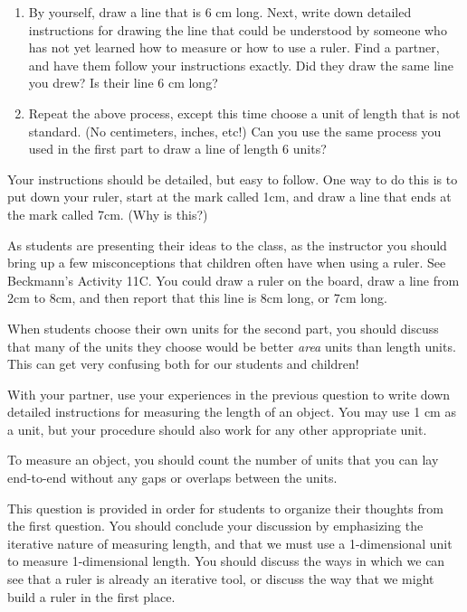 \documentclass[handout]{ximera}
\begin{document}
\begin{problem}
\hfill
\begin{enumerate}
\item By yourself, draw a line that is 6 cm long.  Next, write down detailed instructions for drawing the line that could be understood by someone who has not yet learned how to measure or how to use a ruler.  Find a partner, and have them follow your instructions exactly.  Did they draw the same line you drew?  Is their line 6 cm long?  
\item Repeat the above process, except this time choose a unit of length that is not standard.  (No centimeters, inches, etc!)  Can you use the same process you used in the first part to draw a line of length 6 units?
\end{enumerate}


\begin{solution}
Your instructions should be detailed, but easy to follow.  One way to do this is to put down your ruler, start at the mark called 1cm, and draw a line that ends at the mark called 7cm.  (Why is this?)
\end{solution}

\begin{instructorNotes}
As students are presenting their ideas to the class, as the instructor you should bring up a few misconceptions that children often have when using a ruler.  See Beckmann's Activity 11C.  You could draw a ruler on the board, draw a line from 2cm to 8cm, and then report that this line is 8cm long, or 7cm long.

When students choose their own units for the second part, you should discuss that many of the units they choose would be better {\em area} units than length units.  This can get very confusing both for our students and children!
\end{instructorNotes}
\end{problem}

\begin{problem}
With your partner, use your experiences in the previous question to write down detailed instructions for measuring the length of an object.  You may use 1 cm as a unit, but your procedure should also work for any other appropriate unit.

\begin{solution}
To measure an object, you should count the number of units that you can lay end-to-end without any gaps or overlaps between the units.
\end{solution}

\begin{instructorNotes}
This question is provided in order for students to organize their thoughts from the first question.  You should conclude your discussion by emphasizing the iterative nature of measuring length, and that we must use a 1-dimensional unit to measure 1-dimensional length.  You should discuss the ways in which we can see that a ruler is already an iterative tool, or discuss the way that we might build a ruler in the first place.
\end{instructorNotes}
\end{problem}
\end{document}
